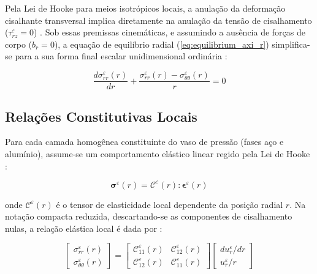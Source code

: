 
Pela Lei de Hooke para meios isotrópicos locais, a anulação da deformação cisalhante transversal implica diretamente na anulação da tensão de cisalhamento ($\tau_{rz}^\varepsilon = 0$) \cite{Timoshenko_1951}. Sob essas premissas cinemáticas, e assumindo a ausência de forças de corpo ($b_r = 0$), a equação de equilíbrio radial (\eqref{eq:equilibrium_axi_r}) simplifica-se para a sua forma final escalar unidimensional ordinária \cite{Timoshenko_1951}:

\begin{equation}
  \frac{d \sigma_{rr}^\varepsilon(r)}{d r} + \frac{\sigma_{rr}^\varepsilon(r) - \sigma_{\theta\theta}^\varepsilon(r)}{r} = 0
  \label{eq:equilibrium_radial_1d}
\end{equation}


\subsection{Relações Constitutivas Locais}

Para cada camada homogênea constituinte do vaso de pressão (fases aço e alumínio), assume-se um comportamento elástico linear regido pela Lei de Hooke \cite{Sadd2009}:

\begin{equation}
  \mathbf{\sigma}^\varepsilon (r) = \mathbf{\mathcal{C}}^\varepsilon (r) : \mathbf{\epsilon}^\varepsilon (r)
  \label{eq:hooke_tensor_local}
\end{equation}

onde $\mathbf{\mathcal{C}}^\varepsilon (r)$ é o tensor de elasticidade local dependente da posição radial $r$. Na notação compacta reduzida, descartando-se as componentes de cisalhamento nulas, a relação elástica local é dada por \cite{Sadd2009}:


\begin{equation}
  \begin{bmatrix}
    \sigma_{rr}^\varepsilon (r) \\
    \sigma_{\theta\theta}^\varepsilon (r)
  \end{bmatrix} =
  \begin{bmatrix}
    \mathcal{C}_{11}^\varepsilon (r) & \mathcal{C}_{12}^\varepsilon (r) \\
    \mathcal{C}_{12}^\varepsilon (r) & \mathcal{C}_{11}^\varepsilon (r)
  \end{bmatrix}
  \begin{bmatrix}
    d u_r^\varepsilon / d r \\
    u_r^\varepsilon / r
  \end{bmatrix}
  \label{eq:voigt_hooke_radial}
\end{equation}


